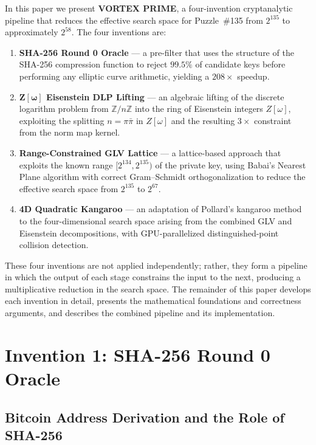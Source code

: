 \documentclass[11pt,a4paper]{article}
\theoremstyle{definition}
\begin{document}
In this paper we present \textbf{VORTEX PRIME}, a four-invention cryptanalytic pipeline that reduces the effective search space for Puzzle~\#135 from $2^{135}$ to approximately $2^{58}$. The four inventions are:
\begin{enumerate}
  \item \textbf{SHA-256 Round 0 Oracle} --- a pre-filter that uses the structure of the SHA-256 compression function to reject $99.5\%$ of candidate keys before performing any elliptic curve arithmetic, yielding a $208\times$ speedup.
  \item \textbf{$\mathbf{Z[\omega]}$ Eisenstein DLP Lifting} --- an algebraic lifting of the discrete logarithm problem from $\mathbb{Z}/n\mathbb{Z}$ into the ring of Eisenstein integers $Z[\omega]$, exploiting the splitting $n = \pi \bar{\pi}$ in $Z[\omega]$ and the resulting $3\times$ constraint from the norm map kernel.
  \item \textbf{Range-Constrained GLV Lattice} --- a lattice-based approach that exploits the known range $[2^{134}, 2^{135})$ of the private key, using Babai's Nearest Plane algorithm with correct Gram--Schmidt orthogonalization to reduce the effective search space from $2^{135}$ to $2^{67}$.
  \item \textbf{4D Quadratic Kangaroo} --- an adaptation of Pollard's kangaroo method to the four-dimensional search space arising from the combined GLV and Eisenstein decompositions, with GPU-parallelized distinguished-point collision detection.
\end{enumerate}
These four inventions are not applied independently; rather, they form a pipeline in which the output of each stage constrains the input to the next, producing a multiplicative reduction in the search space. The remainder of this paper develops each invention in detail, presents the mathematical foundations and correctness arguments, and describes the combined pipeline and its implementation.

\section{Invention 1: SHA-256 Round 0 Oracle}

\subsection{Bitcoin Address Derivation and the Role of SHA-256}
\end{document}
